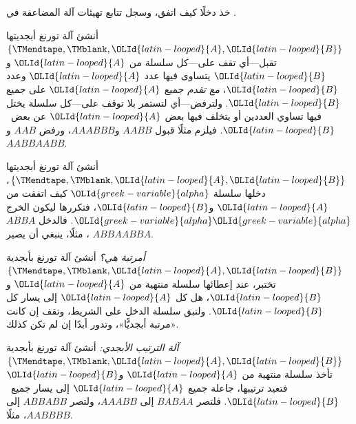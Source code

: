 \documentclass[../../../include/open-logic-section]{subfiles}
\begin{document}
\begin{prob}
خذ دخلًا كيف اتفق، وسجل تتابع تهيئات آلة المضاعفة في .
\end{prob}

\begin{prob}
أنشئ آلة تورنغ أبجديتها $\{\TMendtape,\TMblank,{\OLId{latin-looped}{A}},{\OLId{latin-looped}{B}}\}$ تقبل---أي تقف على---كل سلسلة من ${\OLId{latin-looped}{A}}$ و${\OLId{latin-looped}{B}}$ يتساوى فيها عدد ${\OLId{latin-looped}{A}}$ وعدد ${\OLId{latin-looped}{B}}$، \emph{مع تقدم} جميع ${\OLId{latin-looped}{A}}$ على جميع ${\OLId{latin-looped}{B}}$. ولترفض---أي لتستمر بلا توقف على---كل سلسلة يختل فيها تساوي العددين أو يتخلف فيها بعض ${\OLId{latin-looped}{A}}$ عن بعض~${\OLId{latin-looped}{B}}$. فيلزم مثلًا قبول $AABB$ و$AAABBB$، ورفض $AAB$ و$AABBAABB$.
\end{prob}

\begin{prob}
أنشئ آلة تورنغ أبجديتها $\{\TMendtape,\TMblank,{\OLId{latin-looped}{A}},{\OLId{latin-looped}{B}}\}$، دخلها سلسلة ${\OLId{greek-variable}{alpha}}$ كيف اتفقت من ${\OLId{latin-looped}{A}}$ و${\OLId{latin-looped}{B}}$، فتكررها ليكون الخرج ${\OLId{greek-variable}{alpha}}{\OLId{greek-variable}{alpha}}$. فالدخل $ABBA$، مثلًا، ينبغي أن يصير $ABBAABBA$.
\end{prob}

\begin{prob}
\emph{أمرتبة هي؟} أنشئ آلة تورنغ بأبجدية $\{\TMendtape,\TMblank,{\OLId{latin-looped}{A}},{\OLId{latin-looped}{B}}\}$ تختبر، عند إعطائها سلسلة منتهية من ${\OLId{latin-looped}{A}}$ و${\OLId{latin-looped}{B}}$، هل كل ${\OLId{latin-looped}{A}}$ إلى يسار كل ${\OLId{latin-looped}{B}}$. ولتبق سلسلة الدخل على الشريط، وتقف إن كانت «مرتبة أبجديًّا»، وتدور أبدًا إن لم تكن كذلك.
\end{prob}

\begin{prob}
\emph{آلة الترتيب الأبجدي:} أنشئ آلة تورنغ بأبجدية $\{\TMendtape,\TMblank,{\OLId{latin-looped}{A}},{\OLId{latin-looped}{B}}\}$ تأخذ سلسلة منتهية من ${\OLId{latin-looped}{A}}$ و${\OLId{latin-looped}{B}}$ فتعيد ترتيبها، جاعلة جميع ${\OLId{latin-looped}{A}}$ إلى يسار جميع~${\OLId{latin-looped}{B}}$. فلتصر $BABAA$ إلى $AAABB$، ولتصر $ABBABB$ إلى $AABBBB$، مثلًا.
\end{prob}
\end{document}
